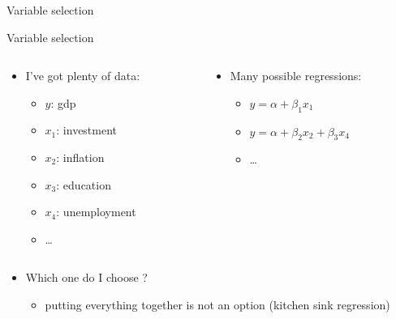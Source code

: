 \documentclass[
  ignorenonframetext,
  aspectratio=169,
]{beamer}
\providecommand{\tightlist}{%
  \setlength{\itemsep}{0pt}\setlength{\parskip}{0pt}}\usepackage{longtable,booktabs,array}
\begin{document}
\begin{frame}{Variable selection}
\protect\hypertarget{variable-selection}{}
\begin{block}{Variable selection}
\protect\hypertarget{variable-selection-1}{}
\begin{columns}[T]
\begin{column}{0.48\textwidth}
\begin{itemize}
\tightlist
\item
  I've got plenty of data:

  \begin{itemize}
  \tightlist
  \item
    \(y\): gdp
  \item
    \(x_1\): investment
  \item
    \(x_2\): inflation
  \item
    \(x_3\): education
  \item
    \(x_4\): unemployment
  \item
    \ldots{}
  \end{itemize}
\end{itemize}
\end{column}

\begin{column}{0.48\textwidth}
\begin{itemize}
\tightlist
\item
  Many possible regressions:

  \begin{itemize}
  \tightlist
  \item
    \(y = α + \beta_1 x_1\)
  \item
    \(y = α + \beta_2 x_2 + \beta_3 x_4\)
  \item
    \ldots{}
  \end{itemize}
\end{itemize}
\end{column}
\end{columns}

\pause

\begin{itemize}
\tightlist
\item
  Which one do I choose ?

  \begin{itemize}
  \tightlist
  \item
    putting everything together is not an option (kitchen sink
    regression)
  \end{itemize}
\end{itemize}
\end{block}


\end{frame}
\end{document}
